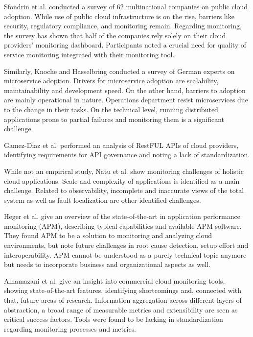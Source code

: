 \documentclass[runningheads]{llncs}
\begin{document}
Sfondrin et al. \cite{sfondrini2018cloudadoption} conducted a survey of 62 multinational companies on public cloud adoption. While use of public cloud infrastructure is on the rise, barriers like security, regulatory compliance, and monitoring remain. Regarding monitoring, the survey has shown that half of the companies rely solely on their cloud providers' monitoring dashboard. Participants noted a crucial need for quality of service monitoring integrated with their monitoring tool.

Similarly, Knoche and Hasselbring \cite{knoche2019drivers} conducted a survey of German experts on microservice adoption. Drivers for microservice adoption are scalability, maintainability and development speed. On the other hand, barriers to adoption are mainly operational in nature. Operations department resist microservices due to the change in their tasks. On the technical level, running distributed applications prone to partial failures and monitoring them is a significant challenge.

Gamez-Diaz et al. \cite{diaz2017restfulAPIs} performed an analysis of RestFUL APIs of cloud providers, identifying requirements for API governance and noting a lack of standardization.

While not an empirical study, Natu et al. \cite{natu2016holistic} show monitoring challenges of holistic cloud applications. Scale and complexity of applications is identified as a main challenge. Related to observability, incomplete and inaccurate views of the total system as well as fault localization are other identified challenges. 

Heger et al.\cite{heger2017APM} give an overview of the state-of-the-art in application performance monitoring (APM), describing typical capabilities and available APM software. They found APM to be a solution to monitoring and analyzing cloud environments, but note future challenges in root cause detection, setup effort and interoperability. APM cannot be understood as a purely technical topic anymore but needs to incorporate business and organizational aspects as well.

Alhamazani et al. \cite{alhamazani2015commercialtools} give an insight into commercial cloud monitoring tools, showing state-of-the-art features, identifying shortcomings and, connected with that, future areas of research. Information aggregation across different layers of abstraction, a broad range of measurable metrics and extensibility are seen as critical success factors. Tools were found to be lacking in standardization regarding monitoring processes and metrics.
\end{document}
